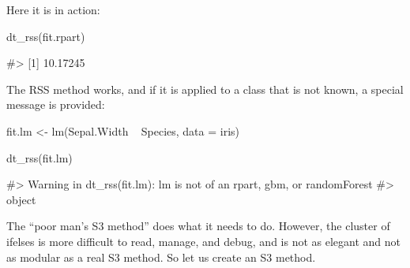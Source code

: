\begin{Schunk} 
\end{Schunk}

Here it is in action:

\begin{Schunk}
\begin{Sinput}
dt_rss(fit.rpart)
\end{Sinput}
\begin{Soutput}
#> [1] 10.17245
\end{Soutput}
\end{Schunk}

The RSS method works, and if it is applied to a class that is not known,
a special message is provided:

\begin{Schunk}
\begin{Sinput}
fit.lm <- lm(Sepal.Width ~ Species, data = iris)

dt_rss(fit.lm)
\end{Sinput}
\begin{Soutput}
#> Warning in dt_rss(fit.lm): lm is not of an rpart, gbm, or randomForest
#> object
\end{Soutput}
\end{Schunk}

The ``poor man's S3 method'' does what it needs to do. However, the
cluster of ifelses is more difficult to read, manage, and debug, and is
not as elegant and not as modular as a real S3 method. So let us create
an S3 method.

